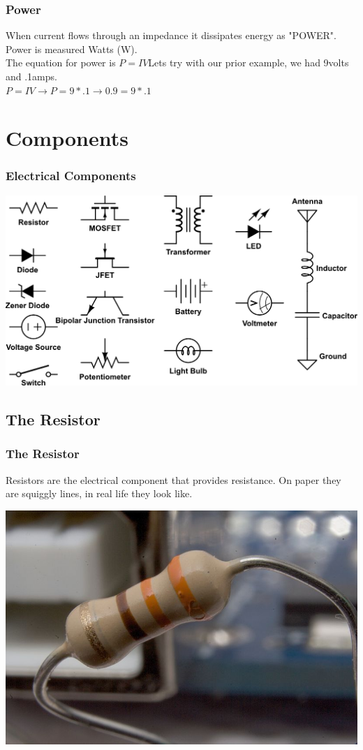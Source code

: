 \documentclass[10pt]{beamer}
\begin{document}
\begin{frame}
\frametitle{Power}
When current flows through an impedance it dissipates energy as "POWER". Power is measured Watts (W).\\
The equation for power is $P=IV$\pause Lets try with our prior example, we had 9volts and .1amps.\\
$P=IV \to P=9*.1$\pause$\to 0.9=9*.1$
\end{frame}

\section{Components}
\begin{frame}
\frametitle{Electrical Components}
\begin{center}
\includegraphics[width=\textwidth]{components.png}
\end{center}
\end{frame}

\subsection{The Resistor}
\begin{frame}
\frametitle{The Resistor}
Resistors are the electrical component that provides resistance. On paper they are squiggly lines, in real life they look like.\\\pause
\begin{center}
\includegraphics[height=.8\textheight]{resistor.jpg}
\end{center}
\end{frame}
\end{document}

